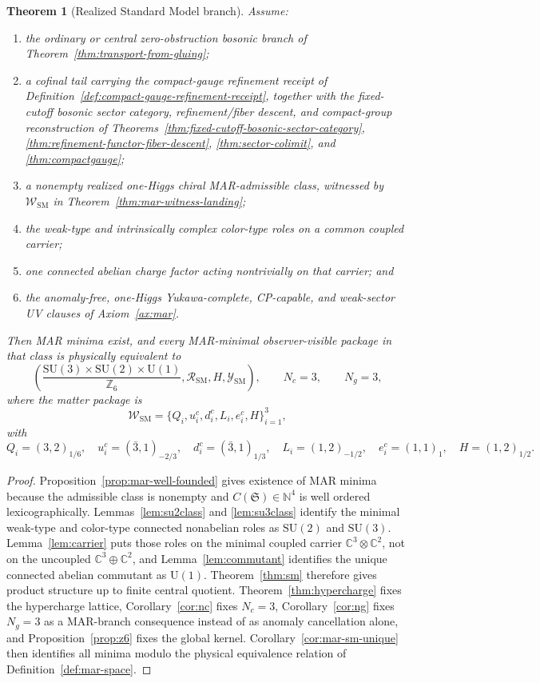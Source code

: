 \documentclass[11pt]{article}
\newtheorem{theorem}{Theorem}[section]
\newcommand{\SU}{\mathrm{SU}}
\newcommand{\U}{\mathrm{U}}
\begin{document}
\begin{theorem}[Realized Standard Model branch]\label{thm:realized-sm-branch}
Assume:
\begin{enumerate}[label=\textup{(\arabic*)},leftmargin=2em]
\item the ordinary or central zero-obstruction bosonic branch of
Theorem~\ref{thm:transport-from-gluing};
\item a cofinal tail carrying the compact-gauge refinement receipt of
Definition~\ref{def:compact-gauge-refinement-receipt}, together with the fixed-cutoff bosonic sector category, refinement/fiber descent, and compact-group
reconstruction of Theorems~\ref{thm:fixed-cutoff-bosonic-sector-category},
\ref{thm:refinement-functor-fiber-descent}, \ref{thm:sector-colimit}, and
\ref{thm:compactgauge};
\item a nonempty realized one-Higgs chiral MAR-admissible class, witnessed by
\(\mathcal W_{\mathrm{SM}}\) in Theorem~\ref{thm:mar-witness-landing};
\item the weak-type and intrinsically complex color-type roles on a common coupled carrier;
\item one connected abelian charge factor acting nontrivially on that carrier; and
\item the anomaly-free, one-Higgs Yukawa-complete, CP-capable, and weak-sector UV clauses of
Axiom~\ref{ax:mar}.
\end{enumerate}
Then MAR minima exist, and every MAR-minimal observer-visible package in that class is physically
equivalent to
\[
\left(
\frac{\SU(3)\times\SU(2)\times\U(1)}{\mathbb Z_6},
\mathcal R_{\mathrm{SM}},
H,
\mathcal Y_{\mathrm{SM}}
\right),
\qquad
N_c=3,\qquad N_g=3,
\]
where the matter package is
\[
\mathcal W_{\mathrm{SM}}
=
\{Q_i,u_i^c,d_i^c,L_i,e_i^c,H\}_{i=1}^{3},
\]
with
\[
Q_i=(3,2)_{1/6},\quad
u_i^c=(\bar 3,1)_{-2/3},\quad
d_i^c=(\bar 3,1)_{1/3},\quad
L_i=(1,2)_{-1/2},\quad
e_i^c=(1,1)_1,\quad
H=(1,2)_{1/2}.
\]
\end{theorem}

\begin{proof}
Proposition~\ref{prop:mar-well-founded} gives existence of MAR minima because the admissible
class is nonempty and \(C(\mathfrak S)\in\mathbb N^4\) is well ordered lexicographically.
Lemmas~\ref{lem:su2class} and \ref{lem:su3class} identify the minimal weak-type and color-type
connected nonabelian roles as \(\SU(2)\) and \(\SU(3)\). Lemma~\ref{lem:carrier} puts those roles
on the minimal coupled carrier \(\mathbb C^3\otimes\mathbb C^2\), not on the uncoupled
\(\mathbb C^3\oplus\mathbb C^2\), and Lemma~\ref{lem:commutant} identifies the unique connected
abelian commutant as \(\U(1)\). Theorem~\ref{thm:sm} therefore gives product structure up to
finite central quotient. Theorem~\ref{thm:hypercharge} fixes the hypercharge lattice,
Corollary~\ref{cor:nc} fixes \(N_c=3\), Corollary~\ref{cor:ng} fixes \(N_g=3\) as a
MAR-branch consequence instead of as anomaly cancellation alone, and Proposition~\ref{prop:z6}
fixes the global kernel. Corollary~\ref{cor:mar-sm-unique} then identifies all minima modulo
the physical equivalence relation of Definition~\ref{def:mar-space}.
\end{proof}
\end{document}
